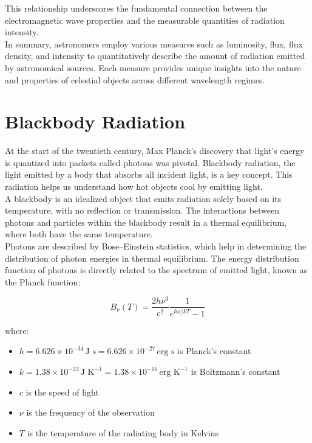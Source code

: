 This relationship underscores the fundamental connection between the electromagnetic wave properties and the measurable quantities of radiation intensity. \\

In summary, astronomers employ various measures such as luminosity, flux, flux density, and intensity to quantitatively describe the amount of radiation emitted by astronomical sources. Each measure provides unique insights into the nature and properties of celestial objects across different wavelength regimes.

\section{Blackbody Radiation}
\label{sec:blackbodyradiation}

At the start of the twentieth century, Max Planck's discovery that light's energy is quantized into packets called photons was pivotal. Blackbody radiation, the light emitted by a body that absorbs all incident light, is a key concept. This radiation helps us understand how hot objects cool by emitting light. \\

A blackbody is an idealized object that emits radiation solely based on its temperature, with no reflection or transmission. The interactions between photons and particles within the blackbody result in a thermal equilibrium, where both have the same temperature. \\

Photons are described by Bose–Einstein statistics, which help in determining the distribution of photon energies in thermal equilibrium. The energy distribution function of photons is directly related to the spectrum of emitted light, known as the Planck function:

\begin{equation}
	B_\nu (T) = \frac{2h\nu^3}{c^2} \frac{1}{e^{h\nu/kT} - 1}
	\label{eq:planckfunctionfrequency}
\end{equation}


where:
\begin{itemize}
    \item \(h = 6.626 \times 10^{-34} \, \text{J s} = 6.626 \times 10^{-27} \, \text{erg s}\) is Planck’s constant
    \item \(k = 1.38 \times 10^{-23} \, \text{J K}^{-1} = 1.38 \times 10^{-16} \, \text{erg K}^{-1}\) is Boltzmann’s constant
    \item \(c\) is the speed of light
    \item \(\nu\) is the frequency of the observation
    \item \(T\) is the temperature of the radiating body in Kelvins
\end{itemize}

